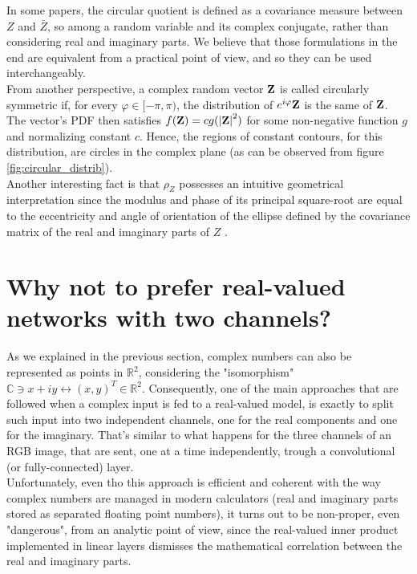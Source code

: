 \documentclass[../main.tex]{subfiles}
\begin{document}
In some papers, the circular quotient is defined as a covariance measure between $Z$ and $\bar{Z}$, so among a random variable and its complex conjugate, rather than considering real and imaginary parts. We believe that those formulations in the end are equivalent from a practical point of view, and so they can be used interchangeably.\\
From another perspective, a complex random vector $\vb{Z}$ is called circularly symmetric if, for every $\varphi\in[-\pi,\pi)$, the distribution of $e^{i\varphi}\vb{Z}$ is the same of $\vb{Z}$. The vector's PDF then satisfies $f(\vb{Z})=cg(\abs{\vb{Z}}^2)$ for some non-negative function $g$ and normalizing constant $c$. Hence, the regions of constant contours, for this distribution, are circles in the complex plane (as can be observed from figure \ref{fig:circular_distrib}).\\
Another interesting fact is that $\rho_Z$ possesses an intuitive geometrical interpretation since the modulus and phase of its principal square-root are equal to the eccentricity and angle of orientation of the ellipse defined by the covariance matrix of the real and imaginary parts of $Z$ \cite{circularity_geometric_interpretation}.


\section{Why not to prefer real-valued networks with two channels?}
As we explained in the previous section, complex numbers can also be represented as points in $\mathds{R}^2$, considering the "isomorphism" $\mathds{C}\ni x+iy \leftrightarrow (x,y)^T\in\mathds{R}^2$. Consequently, one of the main approaches that are followed when a complex input is fed to a real-valued model, is exactly to split such input into two independent channels, one for the real components and one for the imaginary. That's similar to what happens for the three channels of an RGB image, that are sent, one at a time independently, trough a convolutional (or fully-connected) layer.\\
Unfortunately, even tho this approach is efficient and coherent with the way complex numbers are managed in modern calculators (real and imaginary parts stored as separated floating point numbers), it turns out to be non-proper, even "dangerous", from an analytic point of view, since the real-valued inner product implemented in linear layers dismisses the mathematical correlation between the real and imaginary parts. 
\end{document}
